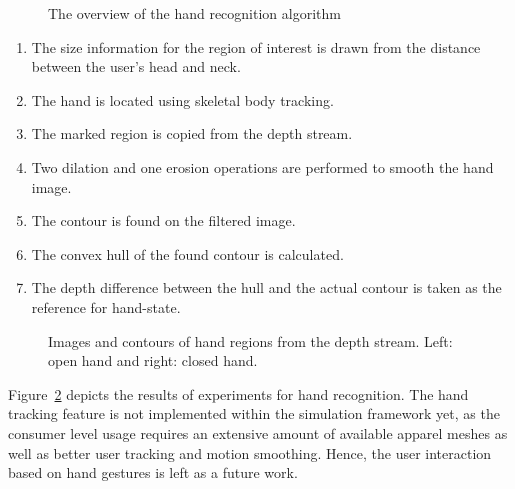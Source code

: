 \begin{figure}[ht]
\centerline{}
\caption{The overview of the hand recognition algorithm}
\label{fig:hand_recognition_cycle}
\end{figure} 

\begin{enumerate}
\item The size information for the region of interest is drawn from the distance between the user's head and neck.
\item The hand is located using skeletal body tracking.
\item The marked region is copied from the depth stream. 
\item Two dilation and one erosion operations are performed to smooth the hand image.
\item The contour is found on the filtered image.
\item The convex hull of the found contour is calculated.
\item The depth difference between the hull and the actual contour is taken as the reference for hand-state.
\end{enumerate}

\begin{figure}[ht]
\centerline{}
\caption{Images and contours of hand regions from the depth stream. Left: open hand and right: closed hand.}
\label{fig:open_closed_hands}
\end{figure}

Figure~\ref{fig:open_closed_hands} depicts the results of experiments for hand recognition. The hand tracking feature is not implemented within the simulation framework yet, as the consumer level usage requires an extensive amount of available apparel meshes as well as better user tracking and motion smoothing. Hence, the user interaction based on hand gestures is left as a future work.

